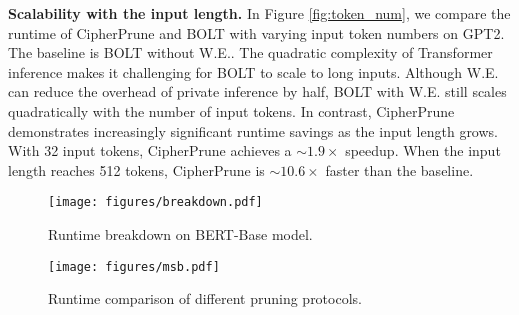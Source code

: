 
\noindent\textbf{Scalability with the input length.} 
In Figure \ref{fig:token_num}, we compare the runtime of CipherPrune and BOLT with varying input token numbers on GPT2. The baseline is BOLT without W.E.. The quadratic complexity of Transformer inference makes it challenging for BOLT to scale to long inputs. Although W.E. can reduce the overhead of private inference by half, BOLT with W.E. still scales quadratically with the number of input tokens. In contrast, CipherPrune demonstrates increasingly significant runtime savings as the input length grows. With 32 input tokens, CipherPrune achieves a $\sim 1.9\times$ speedup. When the input length reaches 512 tokens, CipherPrune is $\sim10.6\times$ faster than the baseline.



\begin{figure}[h]
    \centering
    \vspace{-0.2in}
    \begin{minipage}{0.75\textwidth}
        \centering
        \texttt{[image: figures/breakdown.pdf]}
        \captionsetup{skip=2pt}
        \caption{Runtime breakdown on BERT-Base model.}
        \label{fig:breakdown}
    \end{minipage}\hfill
    \begin{minipage}{0.25\textwidth}
      \centering
      \texttt{[image: figures/msb.pdf]}
      \caption{Runtime comparison of different pruning protocols.}
      \label{fig:msb}
    \end{minipage}
\end{figure}

